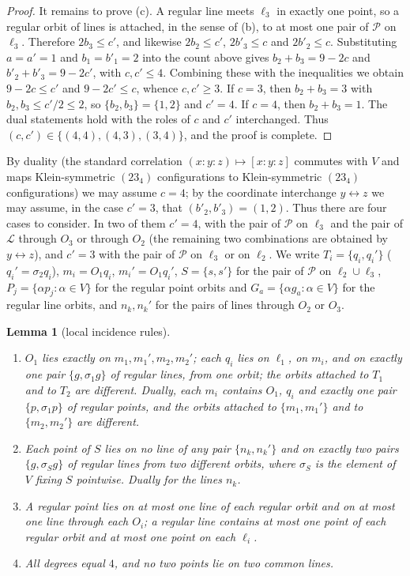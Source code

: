\documentclass[11pt]{article}
\theoremstyle{plain}
\newtheorem{lemma}[theorem]{Lemma}
\theoremstyle{definition}
\newcommand{\cP}{\mathcal{P}}
\newcommand{\cL}{\mathcal{L}}
\begin{document}
\begin{proof}
It remains to prove (c).  A regular line meets $\ell_3$ in exactly one point, so a regular orbit of lines is attached, in the sense of (b), to at most one pair of $\cP$ on $\ell_3$.  Therefore $2b_3\le c'$, and likewise $2b_2\le c'$, $2b'_3\le c$ and $2b'_2\le c$.  Substituting $a=a'=1$ and $b_1=b'_1=2$ into the count above gives $b_2+b_3=9-2c$ and $b'_2+b'_3=9-2c'$, with $c,c'\le4$.  Combining these with the inequalities we obtain $9-2c\le c'$ and $9-2c'\le c$, whence $c,c'\ge3$.  If $c=3$, then $b_2+b_3=3$ with $b_2,b_3\le c'/2\le2$, so $\{b_2,b_3\}=\{1,2\}$ and $c'=4$.  If $c=4$, then $b_2+b_3=1$.  The dual statements hold with the roles of $c$ and $c'$ interchanged.  Thus $(c,c')\in\{(4,4),(4,3),(3,4)\}$, and the proof is complete.
\end{proof}

By duality (the standard correlation $(x{:}y{:}z)\mapsto[x{:}y{:}z]$ commutes with $V$ and maps Klein-symmetric $(23_4)$ configurations to Klein-symmetric $(23_4)$ configurations) we may assume $c=4$; by the coordinate interchange $y\leftrightarrow z$ we may assume, in the case $c'=3$, that $(b'_2,b'_3)=(1,2)$.  Thus there are four cases to consider.  In two of them $c'=4$, with the pair of $\cP$ on $\ell_3$ and the pair of $\cL$ through $O_3$ or through $O_2$ (the remaining two combinations are obtained by $y\leftrightarrow z$), and $c'=3$ with the pair of $\cP$ on $\ell_3$ or on $\ell_2$.  We write $T_i=\{q_i,q_i'\}$ ($q_i'=\sigma_2q_i$), $m_i=O_1q_i$, $m_i'=O_1q_i'$, $S=\{s,s'\}$ for the pair of $\cP$ on $\ell_2\cup\ell_3$, $P_j=\{\alpha p_j:\alpha\in V\}$ for the regular point orbits and $G_a=\{\alpha g_a:\alpha\in V\}$ for the regular line orbits, and $n_k,n_k'$ for the pairs of lines through $O_2$ or $O_3$.

\begin{lemma}[local incidence rules]\label{lem:local}
\begin{enumerate}
\item[(i)] $O_1$ lies exactly on $m_1,m_1',m_2,m_2'$; each $q_i$ lies on $\ell_1$, on $m_i$, and on exactly one pair $\{g,\sigma_1g\}$ of regular lines, from one orbit; the orbits attached to $T_1$ and to $T_2$ are different.  Dually, each $m_i$ contains $O_1$, $q_i$ and exactly one pair $\{p,\sigma_1p\}$ of regular points, and the orbits attached to $\{m_1,m_1'\}$ and to $\{m_2,m_2'\}$ are different.
\item[(ii)] Each point of $S$ lies on no line of any pair $\{n_k,n_k'\}$ and on exactly two pairs $\{g,\sigma_Sg\}$ of regular lines from two different orbits, where $\sigma_S$ is the element of $V$ fixing $S$ pointwise.  Dually for the lines $n_k$.
\item[(iii)] A regular point lies on at most one line of each regular orbit and on at most one line through each $O_i$; a regular line contains at most one point of each regular orbit and at most one point on each $\ell_i$.
\item[(iv)] All degrees equal $4$, and no two points lie on two common lines.
\end{enumerate}
\end{lemma}
\end{document}
